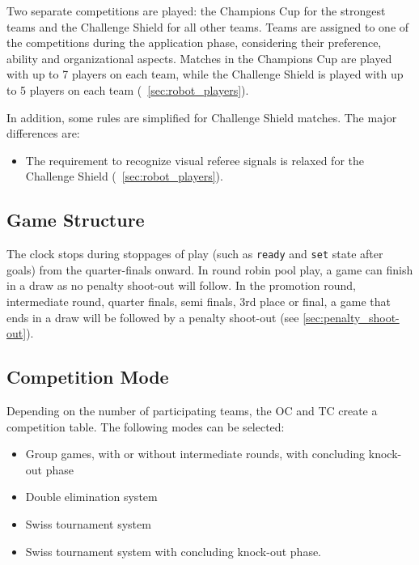Two separate competitions are played: the Champions Cup for the strongest teams and the Challenge Shield for all other teams.
Teams are assigned to one of the competitions during the application phase, considering their preference, ability and organizational aspects.
Matches in the Champions Cup are played with up to 7 players on each team, while the Challenge Shield is played with up to 5 players on each team (\cf~\cref{sec:robot_players}).

In addition, some rules are simplified for Challenge Shield matches. The major differences are:
\begin{itemize}
  \item The requirement to recognize visual referee signals is relaxed for the Challenge Shield (\cf~\cref{sec:robot_players}).

\end{itemize}

\subsection{Game Structure}

The clock stops during stoppages of play (such as \texttt{ready} and \texttt{set} state after goals) from the quarter-finals onward.
In round robin pool play, a game can finish in a draw as no penalty shoot-out will follow.
In the promotion round, intermediate round, quarter finals, semi finals, 3rd place or final, a game that ends in a draw will be followed by a penalty shoot-out (see \cref{sec:penalty_shoot-out}).

\subsection{Competition Mode}

Depending on the number of participating teams, the OC and TC create a competition table.
The following modes can be selected:
\begin{itemize}
  \item Group games, with or without intermediate rounds, with concluding knock-out phase
  \item Double elimination system
  \item Swiss tournament system
  \item Swiss tournament system with concluding knock-out phase.
\end{itemize}


